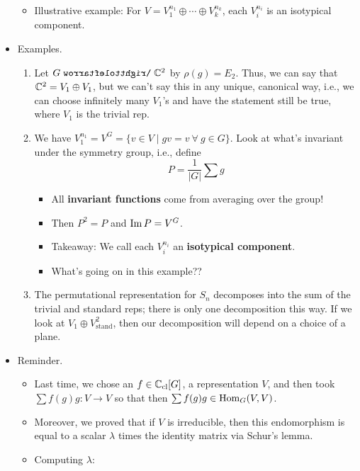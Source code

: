 \documentclass[../notes.tex]{subfiles}
\begin{document}
\begin{itemize}
    \begin{itemize}
        \item Illustrative example: For $V=V_1^{n_1}\oplus\cdots\oplus V_k^{n_k}$, each $V_i^{n_i}$ is an isotypical component.
    \end{itemize}
    \item Examples.
    \begin{enumerate}
        \item Let $G\acts\C^2$ by $\rho(g)=E_2$. Thus, we can say that $\mathbb{C}^2=V_1\oplus V_1$, but we can't say this in any unique, canonical way, i.e., we can choose infinitely many $V_1$'s and have the statement still be true, where $V_1$ is the trivial rep.
        \item We have $V_1^{n_1}=V^G=\{v\in V\mid gv=v\ \forall\ g\in G\}$. Look at what's invariant under the symmetry group, i.e., define
        \begin{equation*}
            P = \frac{1}{|G|}\sum g
        \end{equation*}
        \begin{itemize}
            \item All \textbf{invariant functions} come from averaging over the group!
            \item Then $P^2=P$ and $\operatorname{Im} P=V^G$.
            \item Takeaway: We call each $V_i^{n_i}$ an \textbf{isotypical component}.
            \item What's going on in this example??
        \end{itemize}
        \item The permutational representation for $S_n$ decomposes into the sum of the trivial and standard reps; there is only one decomposition this way. If we look at $V_1\oplus V_\text{stand}^2$, then our decomposition will depend on a choice of a plane.
    \end{enumerate}
    \item Reminder.
    \begin{itemize}
        \item Last time, we chose an $f\in\mathbb{C}_\text{cl}[G]$, a representation $V$, and then took $\sum f(g)g:V\to V$ so that then $\sum f(g)g\in\operatorname{Hom}_G(V,V)$.
        \item Moreover, we proved that if $V$ is irreducible, then this endomorphism is equal to a scalar $\lambda$ times the identity matrix via Schur's lemma.
        \item Computing $\lambda$:
        \begin{equation*}

\end{equation*}
\end{itemize}
\end{itemize}
\end{document}
